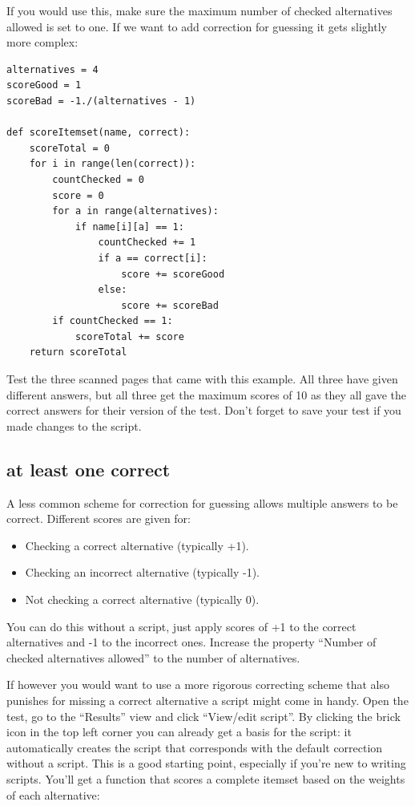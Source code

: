 \documentclass[10pt,a4paper]{article}
\begin{document}
If you would use this, make sure the maximum number of checked alternatives allowed is set to one. If we want to add correction for guessing it gets slightly more complex:

\begin{verbatim}
alternatives = 4
scoreGood = 1
scoreBad = -1./(alternatives - 1)

def scoreItemset(name, correct):
    scoreTotal = 0
    for i in range(len(correct)):
        countChecked = 0
        score = 0
        for a in range(alternatives):          
            if name[i][a] == 1:
                countChecked += 1
                if a == correct[i]:
                    score += scoreGood                    
                else:
                    score += scoreBad   
        if countChecked == 1:
            scoreTotal += score
    return scoreTotal
\end{verbatim}

Test the three scanned pages that came with this example. All three have given different answers, but all three get the maximum scores of 10 as they all gave the correct answers for their version of the test. Don't forget to save your test if you made changes to the script.


\subsection*{at least one correct}

A less common scheme for correction for guessing allows multiple answers to be correct. Different scores are given for: 
\begin{itemize}
\item Checking a correct alternative (typically +1).
\item Checking an incorrect alternative (typically -1).
\item Not checking a correct alternative (typically 0).
\end{itemize}
You can do this without a script, just apply scores of +1 to the correct alternatives and -1 to the incorrect ones. Increase the property ``Number of checked alternatives allowed'' to the number of alternatives.

If however you would want to use a more rigorous correcting scheme that also punishes for missing a correct alternative a script might come in handy. Open the test, go to the ``Results'' view and click ``View/edit script''. By clicking the brick icon in the top left corner you can already get a basis for the script: it automatically creates the script that corresponds with the default correction without a script. This is a good starting point, especially if you're new to writing scripts. You'll get a function that scores a complete itemset based on the weights of each alternative:
\end{document}
